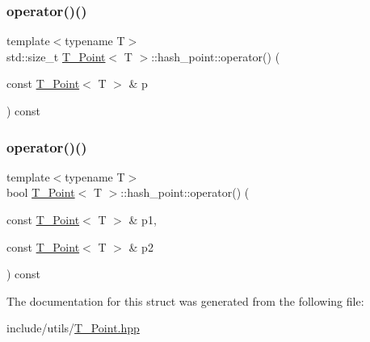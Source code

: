 \subsubsection{\texorpdfstring{operator()()}{operator()()}\hspace{0.1cm}{\footnotesize\ttfamily [1/2]}}
{\footnotesize\ttfamily template$<$typename T$>$ \\
std\+::size\+\_\+t \hyperlink{classT__Point}{T\+\_\+\+Point}$<$ T $>$\+::hash\+\_\+point\+::operator() (\begin{DoxyParamCaption}\item[{const \hyperlink{classT__Point}{T\+\_\+\+Point}$<$ T $>$ \&}]{p }\end{DoxyParamCaption}) const\hspace{0.3cm}{\ttfamily [inline]}}

\mbox{\label{structT__Point_1_1hash__point_a92f4c83c6538fcb66804d44e944d7b20}} 
\subsubsection{\texorpdfstring{operator()()}{operator()()}\hspace{0.1cm}{\footnotesize\ttfamily [2/2]}}
{\footnotesize\ttfamily template$<$typename T$>$ \\
bool \hyperlink{classT__Point}{T\+\_\+\+Point}$<$ T $>$\+::hash\+\_\+point\+::operator() (\begin{DoxyParamCaption}\item[{const \hyperlink{classT__Point}{T\+\_\+\+Point}$<$ T $>$ \&}]{p1,  }\item[{const \hyperlink{classT__Point}{T\+\_\+\+Point}$<$ T $>$ \&}]{p2 }\end{DoxyParamCaption}) const\hspace{0.3cm}{\ttfamily [inline]}}



The documentation for this struct was generated from the following file\+:\begin{DoxyCompactItemize}
\item 
include/utils/\hyperlink{T__Point_8hpp}{T\+\_\+\+Point.\+hpp}\end{DoxyCompactItemize}
